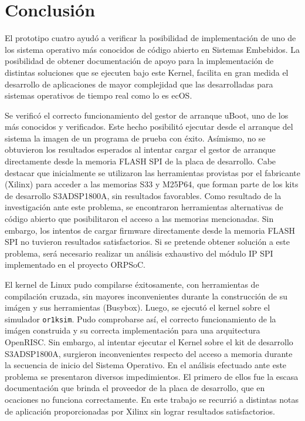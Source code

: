 		
		\newpage
		\section{Conclusión}
		El prototipo cuatro ayudó a verificar la posibilidad de implementación de uno de los sistema operativo más conocidos de código abierto en Sistemas Embebidos.
		La posibilidad de obtener documentación de apoyo para la implementación de distintas soluciones que se ejecuten bajo este Kernel, facilita en gran
		medida el desarrollo de aplicaciones de mayor complejidad que las desarrolladas para sistemas operativos de tiempo real como lo es ecOS.   
		
		Se verificó el correcto funcionamiento del gestor de arranque uBoot, uno de los más conocidos y verificados. Este hecho posibilitó ejecutar desde el
		arranque del sistema la imagen de un programa de prueba con éxito. Asímismo, no se obtuvieron los resultados esperados al intentar cargar el gestor
		de arranque directamente desde la memoria FLASH SPI de la placa de desarrollo. Cabe destacar que inicialmente se utilizaron las herramientas
		provistas por el fabricante (Xilinx) para acceder a las memorias S33 y M25P64, que forman parte de los kits de desarrollo S3ADSP1800A, sin
		resultados favorables. Como resultado de la investigación ante este problema, se encontraron herramientas alternativas de código abierto que
		posibilitaron el acceso a las memorias mencionadas. Sin embargo, los intentos de cargar firmware directamente desde la memoria FLASH SPI no tuvieron
		resultados satisfactorios. Si se pretende obtener solución a este problema, será necesario realizar un análisis exhaustivo del módulo IP SPI
		implementado en el proyecto ORPSoC.
		
		El kernel de Linux pudo compilarse éxitosamente, con herramientas de compilación cruzada, sin mayores inconvenientes durante la construcción de su
		imágen y sus herramientas (Busybox). Luego, se ejecutó el kernel sobre el simulador \verb|or1ksim|. Pudo
		comprobarse así, el correcto funcionamiento de la imágen construida y su correcta implementación para una arquitectura OpenRISC. Sin embargo, al
		intentar ejecutar el Kernel sobre el kit de desarrollo S3ADSP1800A, surgieron inconvenientes respecto del acceso a memoria durante la secuencia de
		inicio del Sistema Operativo. En el análisis efectuado ante este problema se presentaron diversos impedimientos. El primero de ellos fue la escasa
		documentación que brinda el proveedor de la placa de desarrollo, que en ocaciones no funciona correctamente. En este trabajo se recurrió a
		distintas notas de aplicación proporcionadas por Xilinx sin lograr resultados satisfactorios. 
		
